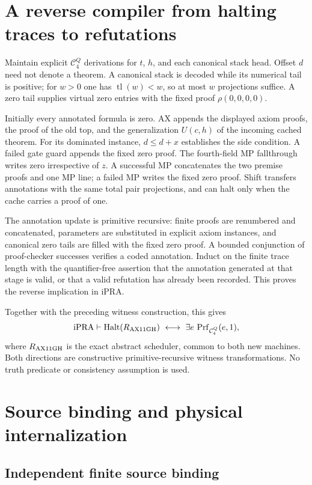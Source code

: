 \documentclass[11pt,a4paper]{article}
\newcommand{\ipra}{\mathrm{iPRA}}
\newcommand{\Halt}{\operatorname{Halt}}
\newcommand{\Prf}{\operatorname{Prf}}
\newcommand{\tl}{\operatorname{tl}}
\begin{document}
\section{A reverse compiler from halting traces to refutations}
\label{sec:annotations}

Maintain explicit $\mathcal C^Q_4$ derivations for $t$, $h$, and
each canonical stack head. Offset $d$ need not denote a theorem.
A canonical stack is decoded while its numerical tail is positive;
for $w>0$ one has $\tl(w)<w$, so at most $w$ projections suffice.
A zero tail supplies virtual zero entries with the fixed proof
$\rho(0,0,0,0)$.

Initially every annotated formula is zero. AX appends the displayed
axiom proofs, the proof of the old top, and the generalization
$U(c,h)$ of the incoming cached theorem. For its dominated instance,
$d\le d+x$ establishes the side condition. A failed gate guard
appends the fixed zero proof. The fourth-field MP fallthrough writes
zero irrespective of $z$. A successful MP concatenates the two
premise proofs and one MP line; a failed MP writes the fixed zero
proof. Shift transfers annotations with the same total pair
projections, and can halt only when the cache carries a proof of one.

The annotation update is primitive recursive: finite proofs are
renumbered and concatenated, parameters are substituted in explicit
axiom instances, and canonical zero tails are filled with the fixed
zero proof. A bounded conjunction of proof-checker successes verifies
a coded annotation. Induct on the finite trace length with the
quantifier-free assertion that the annotation generated at that
stage is valid, or that a valid refutation has already been recorded.
This proves the reverse implication in $\ipra$.

Together with the preceding witness construction, this gives
\[
 \ipra\vdash
 \Halt(R_{\rm AX11GH})\ \longleftrightarrow\
 \exists e\,\Prf_{\mathcal C^Q_4}(e,1),
\]
where $R_{\rm AX11GH}$ is the exact abstract scheduler, common to
both new machines. Both directions are constructive
primitive-recursive witness transformations. No truth predicate or
consistency assumption is used.

\section{Source binding and physical internalization}
\label{sec:physical}

\subsection{Independent finite source binding}
\end{document}
